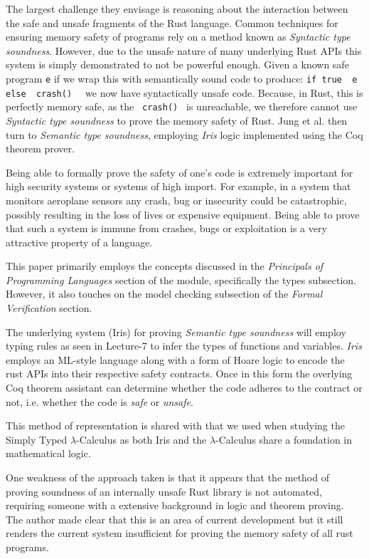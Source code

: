 \documentclass[11pt]{article}
\begin{document}
The largest challenge they envisage is reasoning about the interaction between the safe and unsafe fragments of the Rust language. Common techniques for ensuring memory safety of programs rely on a method known as \textit{Syntactic type soundness}. However, due to the unsafe nature of many underlying Rust APIs this system is simply demonstrated to not be powerful enough. Given a known safe program \texttt{e} if we wrap this with semantically sound code to produce: \texttt{if true { e } else { crash() } } we now have syntactically unsafe code. Because, in Rust, this is perfectly memory safe, as the \texttt{ crash() } is unreachable, we therefore cannot use \textit{Syntactic type soundness} to prove the memory safety of Rust. Jung et al. then turn to \textit{Semantic type soundness}, employing \textit{Iris} logic implemented using the Coq theorem prover.

Being able to formally prove the safety of one's code is extremely important for high security systems or systems of high import. For example, in a system that monitors aeroplane sensors any crash, bug or insecurity could be catastrophic, possibly resulting in the loss of lives or expensive equipment. Being able to prove that such a system is immune from crashes, bugs or exploitation is a very attractive property of a language.

This paper primarily employs the concepts discussed in the \textit{Principals of Programming Languages} section of the module, specifically the types subsection. However, it also touches on the model checking subsection of the \textit{Formal Verification} section.

The underlying system (Iris) for proving \textit{Semantic type soundness} will employ typing rules as seen in Lecture-7 to infer the types of functions and variables. \textit{Iris} employs an ML-style language along with a form of Hoare logic to encode the rust APIs into their respective safety contracts. Once in this form the overlying Coq theorem assistant can determine whether the code adheres to the contract or not, i.e. whether the code is \textit{safe} or \textit{unsafe}. 

This method of representation is shared with that we used when studying the Simply Typed $\lambda$-Calculus as both Iris and the $\lambda$-Calculus share a foundation in mathematical logic. 

One weakness of the approach taken is that it appears that the method of proving soundness of an internally unsafe Rust library is not automated, requiring someone with a extensive background in logic and theorem proving. The author made clear that this is an area of current development but it still renders the current system insufficient for proving the memory safety of all rust programs.
\end{document}
